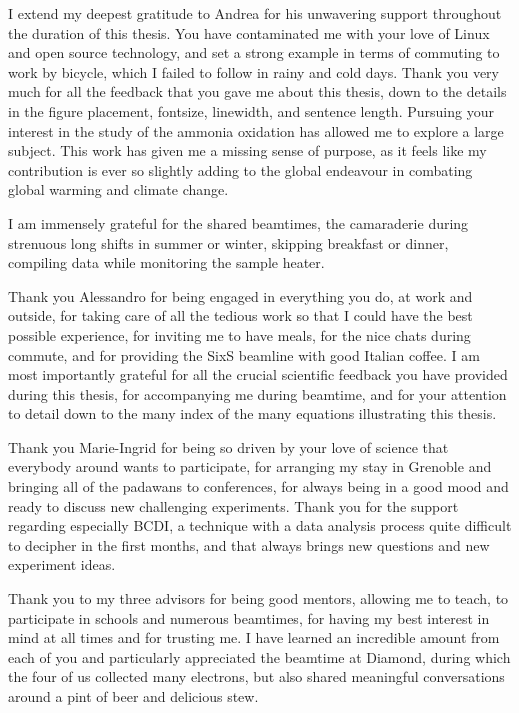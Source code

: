 I extend my deepest gratitude to Andrea for his unwavering support throughout the duration of this thesis.
You have contaminated me with your love of Linux and open source technology, and set a strong example in terms of commuting to work by bicycle, which I failed to follow in rainy and cold days.
Thank you very much for all the feedback that you gave me about this thesis, down to the details in the figure placement, fontsize, linewidth, and sentence length.
Pursuing your interest in the study of the ammonia oxidation has allowed me to explore a large subject.
This work has given me a missing sense of purpose, as it feels like my contribution is ever so slightly adding to the global endeavour in combating global warming and climate change.

I am immensely grateful for the shared beamtimes, the camaraderie during strenuous long shifts in summer or winter, skipping breakfast or dinner, compiling data while monitoring the sample heater.

Thank you Alessandro for being engaged in everything you do, at work and outside, for taking care of all the tedious work so that I could have the best possible experience, for inviting me to have meals, for the nice chats during commute, and for providing the SixS beamline with good Italian coffee.
I am most importantly grateful for all the crucial scientific feedback you have provided during this thesis, for accompanying me during beamtime, and for your attention to detail down to the many index of the many equations illustrating this thesis.

Thank you Marie-Ingrid for being so driven by your love of science that everybody around wants to participate, for arranging my stay in Grenoble and bringing all of the padawans to conferences, for always being in a good mood and ready to discuss new challenging experiments.
Thank you for the support regarding especially BCDI, a technique with a data analysis process quite difficult to decipher in the first months, and that always brings new questions and new experiment ideas.

Thank you to my three advisors for being good mentors, allowing me to teach, to participate in schools and numerous beamtimes, for having my best interest in mind at all times and for trusting me.
I have learned an incredible amount from each of you and particularly appreciated the beamtime at Diamond, during which the four of us collected many electrons, but also shared meaningful conversations around a pint of beer and delicious stew.

